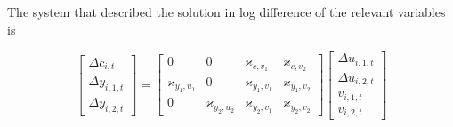 \documentclass[notes=show]{beamer}
\begin{document}
\begin{frame}%



The system that described the solution in log difference of the relevant
variables is

\begin{equation}
\left[ 
\begin{array}{c}
\Delta c_{i,t} \\ 
\Delta y_{i,1,t} \\ 
\Delta y_{i,2,t}%
\end{array}%
\right] =\left[ 
\begin{array}{cccc}
0 & 0 & \varkappa _{c,v_{1}} & \varkappa _{c,v_{2}} \\ 
\varkappa _{y_{1},u_{1}} & 0 & \varkappa _{y_{1},v_{1}} & \varkappa
_{y_{1},v_{2}} \\ 
0 & \varkappa _{y_{2},u_{2}} & \varkappa _{y_{2},v_{1}} & \varkappa
_{y_{2},v_{2}}%
\end{array}%
\right] \left[ 
\begin{array}{c}
\Delta u_{i,1,t} \\ 
\Delta u_{i,2,t} \\ 
v_{i,1,t} \\ 
v_{i,2,t}%
\end{array}%
\right]
\end{equation}

\transboxout%
\end{frame}%

\bigskip
\end{document}

